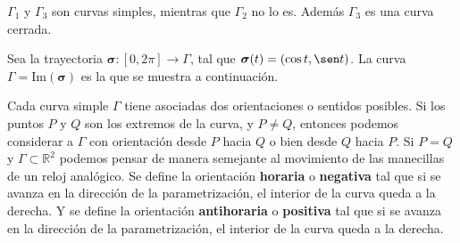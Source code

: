 \begin{example}
    $\Gamma_1$ y $\Gamma_3$ son curvas simples, mientras que $\Gamma_2$ no lo es. Adem\'as $\Gamma_3$ es una curva cerrada. 
\end{example}

\begin{example}
    Sea la trayectoria $\boldsymbol{\sigma}:[0,2\pi]\to\Gamma$, tal que $\boldsymbol{\sigma}(t)=(\cos t, \sen t)$. La curva $\Gamma=\text{Im}(\boldsymbol{\sigma})$ es la que se muestra a continuaci\'on.

    \begin{center}
    \end{center}
    
\end{example}



 \begin{obs}
    Cada curva simple $\Gamma$ tiene asociadas dos orientaciones o sentidos posibles. Si los puntos $P$ y $Q$ son los extremos de la curva, y $P\neq Q$, entonces podemos considerar a $\Gamma$ con orientaci\'on desde $P$ hacia $Q$ o bien desde $Q$ hacia $P$.   Si $P=Q$ y $\Gamma \subset \mathbb{R}^{2}$ podemos pensar de manera semejante al movimiento de las manecillas de un reloj anal\'ogico.  Se define la orientaci\'on \textbf{horaria} o \textbf{negativa} tal que si se avanza en la dirección de la parametrización, el interior de la curva queda a la derecha.  Y se define la orientaci\'on \textbf{antihoraria} o \textbf{positiva} tal que si se avanza en la dirección de la parametrización, el interior de la curva queda a la derecha.
 \end{obs}

